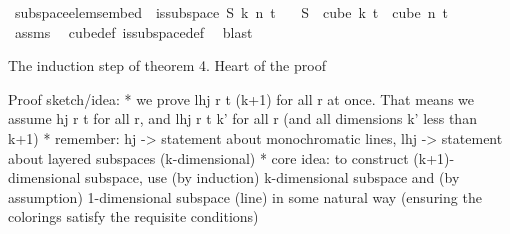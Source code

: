 \begin{isabellebody}
{\isafoldproof}%
%
\isadelimproof
\isanewline
%
\endisadelimproof
\isanewline
{}\isamarkupfalse%
\ subspace{\isacharunderscore}{\kern0pt}elems{\isacharunderscore}{\kern0pt}embed{\isacharcolon}{\kern0pt}\ \ {\isachardoublequoteopen}is{\isacharunderscore}{\kern0pt}subspace\ S\ k\ n\ t{\isachardoublequoteclose}\isanewline
\ \ \ {\isachardoublequoteopen}S\ {\isacharbackquote}{\kern0pt}\ {\isacharparenleft}{\kern0pt}cube\ k\ t{\isacharparenright}{\kern0pt}\ {\isasymsubseteq}\ cube\ n\ t{\isachardoublequoteclose}\isanewline
%
\isadelimproof
\ \ %
\endisadelimproof
%
\isatagproof
{}\isamarkupfalse%
\ assms\ \isamarkupfalse%
\ cube{\isacharunderscore}{\kern0pt}def\ is{\isacharunderscore}{\kern0pt}subspace{\isacharunderscore}{\kern0pt}def\ \isamarkupfalse%
\ blast%
\endisatagproof
{\isafoldproof}%
%
\isadelimproof
%
\endisadelimproof
%
\begin{isamarkuptext}%
The induction step of theorem 4. Heart of the proof%
\end{isamarkuptext}\isamarkuptrue%
%
\begin{isamarkuptext}%
Proof sketch/idea:
  * we prove lhj r t (k+1) for all r at once. That means we assume hj r t for all r, and lhj r t k' for all r (and all dimensions k' less than k+1)
  * remember: hj -> statement about monochromatic lines, lhj -> statement about layered subspaces (k-dimensional)
  * core idea: to construct (k+1)-dimensional subspace, use (by induction) k-dimensional subspace and (by assumption) 1-dimensional subspace (line) in some natural way (ensuring the colorings satisfy the requisite conditions)


\end{isamarkuptext}
\end{isabellebody}
